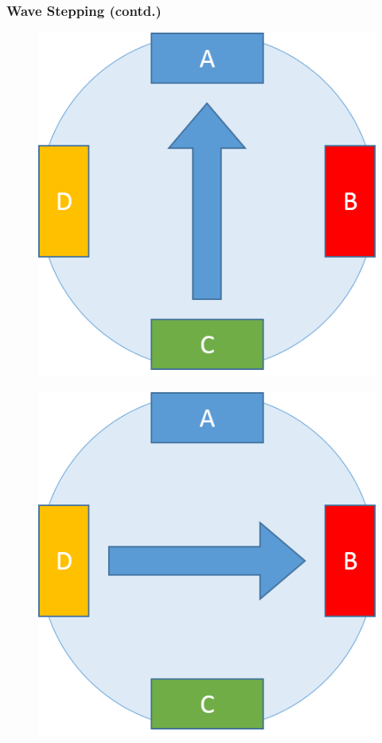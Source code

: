 \documentclass[table,10pt,red]{beamer}	%
\begin{document}
\begin{frame}
	\frametitle{Wave Stepping (contd.)}
	\begin{minipage}[c]{0.24\textwidth}
		\begin{figure}
			\includegraphics[width=0.9\linewidth]{step1}
		\end{figure}
	\end{minipage}
	\begin{minipage}[c]{0.24\textwidth}
		\begin{figure}
			\includegraphics[width=0.9\linewidth]{step3}

\end{figure}
\end{minipage}
\end{frame}
\end{document}
